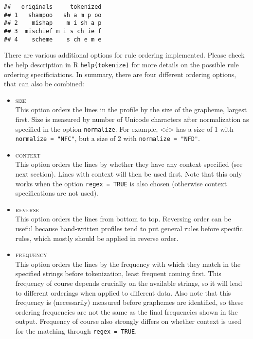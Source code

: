 \documentclass[output=inprep,
		biblatex
		]{LSP/langsci}\usepackage[]{graphicx}\usepackage[]{color}
\makeatletter
\newenvironment{kframe}{%
 \def\at@end@of@kframe{}%
 \ifinner\ifhmode%
  \def\at@end@of@kframe{\end{minipage}}%
  \begin{minipage}{\columnwidth}%
 \fi\fi%
 \def\FrameCommand##1{\hskip\@totalleftmargin \hskip-\fboxsep
 \colorbox{shadecolor}{##1}\hskip-\fboxsep
     \hskip-\linewidth \hskip-\@totalleftmargin \hskip\columnwidth}%
 \MakeFramed {\advance\hsize-\width
   \@totalleftmargin\z@ \linewidth\hsize
   \@setminipage}}%
 {\par\unskip\endMakeFramed%
 \at@end@of@kframe}
\newenvironment{knitrout}{}{} %
\makeatother
\begin{document}
\begin{knitrout}\footnotesize
{}\color{fgcolor}\begin{kframe}
\begin{verbatim}
##   originals     tokenized
## 1   shampoo   sh a m p oo
## 2    mishap    m i sh a p
## 3  mischief m i s ch ie f
## 4    scheme    s ch e m e
\end{verbatim}
\end{kframe}
\end{knitrout}

There are various additional options for rule ordering implemented. Please check
the help description in R \texttt{help(tokenize)} for more details on the
possible rule ordering specificiations. In summary, there are four different 
ordering options, that can also be combined:

\begin{itemize}
  
   \item \textsc{size}\\
         This option orders the lines in the profile by the size of the
         grapheme, largest first. Size is measured by number of Unicode
         characters after normalization as specified in the option
         \texttt{normalize}. For example, <é> has a size of 1 with
         \texttt{normalize = "NFC"}, but a size of 2 with
         \texttt{normalize = "NFD"}.

   \item \textsc{context}\\ This option orders the lines by whether they have
           any context specified (see next section). Lines with context will
           then be used first. Note that this only works when the option
           \texttt{regex = TRUE} is also chosen (otherwise context
           specifications are not used).

   \item \textsc{reverse}\\ This option orders the lines from bottom to top.
         Reversing order can be useful because hand-written profiles tend to put
         general rules before specific rules, which mostly should be applied in
         reverse order.

  \item \textsc{frequency}\\
         This option orders the lines by the frequency with which they
         match in the specified strings before tokenization, least frequent
         coming first. This frequency of course depends crucially on the
         available strings, so it will lead to different orderings when applied
         to different data. Also note that this frequency is (necessarily)
         measured before graphemes are identified, so these ordering frequencies
         are not the same as the final frequencies shown in the output.
         Frequency of course also strongly differs on whether context is used
         for the matching through \texttt{regex = TRUE}.
  
\end{itemize}
\end{document}
